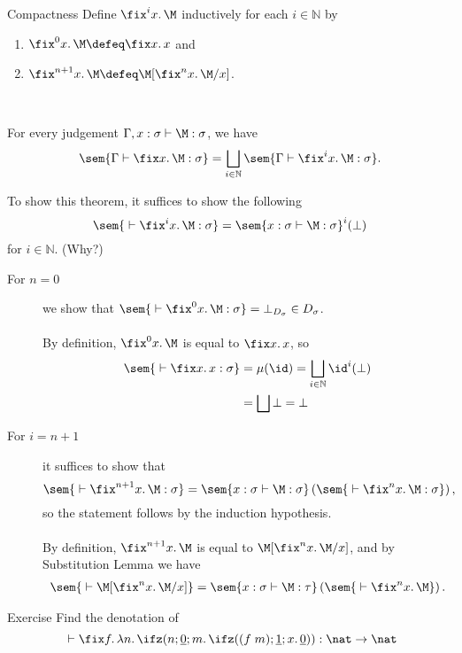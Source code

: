 \begin{frame}{Compactness}
  Define $\fix^i x.\, \M$ inductively for each $i \in \mathbb{N}$ by
  \begin{enumerate}
    \item $\fix^0 x.\, \M \defeq \fix x.\, x$ and
    \item $\fix^{n + 1} x.\, \M \defeq
      \M[\fix^n x.\, \M/ x]$. 
  \end{enumerate}
  ~\\
  \begin{theorem}
    For every judgement $\Gamma, x : \sigma \vdash \M : \sigma$, we have
    \[
      \sem{\Gamma \vdash \fix x.\, \M : \sigma}
      = \bigsqcup_{i \in \mathbb{N}} \sem{\Gamma \vdash \fix^i x.\, \M :
        \sigma}.
    \]
  \end{theorem}
  To show this theorem, it suffices to show the following 
  \[
    \sem{{}\vdash \fix^i x.\,\M : \sigma}
    = \sem{x : \sigma \vdash \M : \sigma}^i(\bot)
  \]
  for $i \in \mathbb{N}$. (Why?)
\end{frame}

\begin{frame}
  \begin{description}
    \item[For $n = 0$] we show that $\sem{{}\vdash \fix^0 x.\,\M : \sigma} =
      \bot_{D_\sigma} \in D_\sigma$.
      \\~\\

      By definition, $\fix^0 x.\, \M$ is equal to
     $\fix x.\, x$, so  
      \begin{align*}
        \sem{{}\vdash \fix x .\, x : \sigma} & = \mu(\id) = \bigsqcup_{i \in
          \mathbb{N}}  \id^i(\bot) \\
        &= \bigsqcup \bot = \bot
      \end{align*}
    \item[For $i = n+1$] it suffices to show that
      \[
        \sem{{}\vdash \fix^{n+1} x.\,\M : \sigma} = \sem{x : \sigma \vdash \M :
          \sigma} \left(\sem{{}\vdash \fix^n x.\,\M:\sigma}\right),
      \] so the statement follows by the induction hypothesis.
      \\~\\

      By definition, $\fix^{n+1} x.\,\M$ is equal to
      $\M[\fix^n x.\,\M/x]$, and by Substitution Lemma we have
      \begin{align*}
        \sem{{}\vdash \M[\fix^n x.\,\M/x]}
        = \sem{x : \sigma \vdash \M : \tau} \left(
          \sem{{}\vdash \fix^n x.\, \M} \right).
      \end{align*}
  \end{description}
\end{frame}


\begin{frame}
  \begin{block}{Exercise}
    Find the denotation of
    \[
      {}\vdash \fix f.\,\lambda n.\,\ifz(n; \underline{0};
      m.\, \ifz((f\; m); \underline{1}; x.\,\underline{0})) : \nat\to\nat
    \]
  \end{block}
\end{frame}



